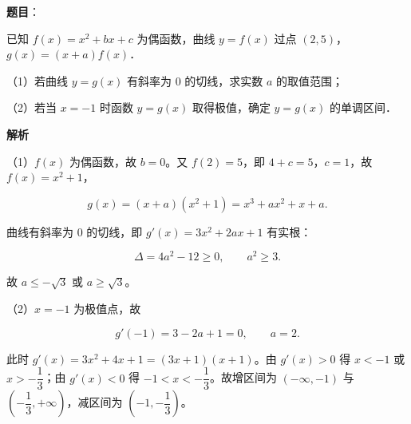 \begin{answer}

\textbf{题目}：

已知 $f(x)=x^2+bx+c$ 为偶函数，曲线 $y=f(x)$ 过点 $(2,5)$，$g(x)=(x+a)f(x)$．

（1）若曲线 $y=g(x)$ 有斜率为 $0$ 的切线，求实数 $a$ 的取值范围；

（2）若当 $x=-1$ 时函数 $y=g(x)$ 取得极值，确定 $y=g(x)$ 的单调区间．

\textbf{解析}

（1）$f(x)$ 为偶函数，故 $b=0$。又 $f(2)=5$，即 $4+c=5$，$c=1$，故 $f(x)=x^2+1$，

\nopagebreak[4]
\[g(x)=(x+a)(x^2+1)=x^3+ax^2+x+a.\]

曲线有斜率为 $0$ 的切线，即 $g'(x)=3x^2+2ax+1$ 有实根：

\nopagebreak[4]
\[\Delta=4a^2-12\geqslant0,\qquad a^2\geqslant3.\]

故 $a\leqslant-\sqrt3$ 或 $a\geqslant\sqrt3$。

（2）$x=-1$ 为极值点，故

\nopagebreak[4]
\[g'(-1)=3-2a+1=0,\qquad a=2.\]

此时 $g'(x)=3x^2+4x+1=(3x+1)(x+1)$。由 $g'(x)>0$ 得 $x<-1$ 或 $x>-\dfrac13$；由 $g'(x)<0$ 得 $-1<x<-\dfrac13$。故增区间为 $(-\infty,-1)$ 与 $\left(-\dfrac13,+\infty\right)$，减区间为 $\left(-1,-\dfrac13\right)$。


\end{answer}
